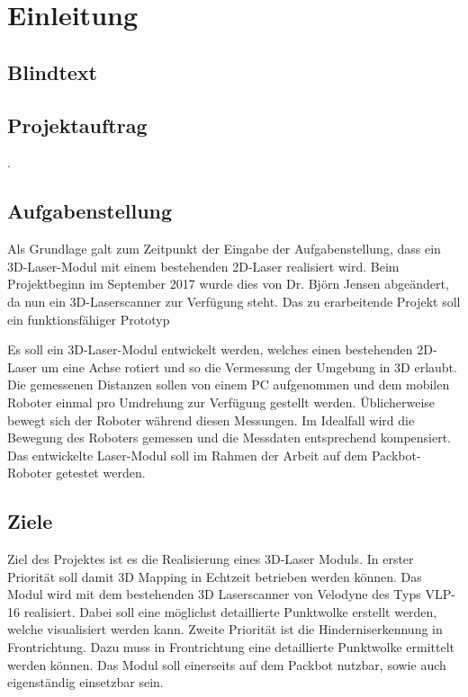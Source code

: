 
\chapter{Einleitung}
\label{Einleitung}

\section{Blindtext} 
\blinditemize

\section {Projektauftrag}
\label{Projektauftrag}
.

\section{Aufgabenstellung}
\label{Aufgabenstellung}
Als Grundlage galt zum Zeitpunkt der Eingabe der Aufgabenstellung, dass ein 3D-Laser-Modul mit einem bestehenden 2D-Laser realisiert wird. Beim Projektbeginn im September 2017 wurde dies von Dr. Björn Jensen abgeändert, da nun ein 3D-Laserscanner zur Verfügung steht. Das zu erarbeitende Projekt soll ein funktionsfähiger Prototyp 


Es soll ein 3D-Laser-Modul entwickelt werden, welches einen bestehenden 2D-Laser um eine Achse
rotiert und so die Vermessung der Umgebung in 3D erlaubt. Die gemessenen Distanzen sollen
von einem PC aufgenommen und dem mobilen Roboter einmal pro Umdrehung zur Verfügung gestellt
werden.
Üblicherweise bewegt sich der Roboter während diesen Messungen. Im Idealfall wird die Bewegung
des Roboters gemessen und die Messdaten entsprechend kompensiert.
Das entwickelte Laser-Modul soll im Rahmen der Arbeit auf dem Packbot-Roboter getestet werden.


\section{Ziele}
\label{Ziele}
Ziel des Projektes ist es die Realisierung eines 3D-Laser Moduls. In erster Priorität soll damit 3D Mapping in Echtzeit betrieben werden können. Das Modul wird mit dem bestehenden 3D Laserscanner von Velodyne des Typs VLP-16 realisiert. Dabei soll eine möglichst detaillierte Punktwolke erstellt werden, welche visualisiert werden kann. Zweite Priorität ist die Hinderniserkennung in Frontrichtung. Dazu muss in Frontrichtung eine detaillierte Punktwolke ermittelt werden können. Das Modul soll einerseits auf dem Packbot nutzbar, sowie auch eigenständig einsetzbar sein.